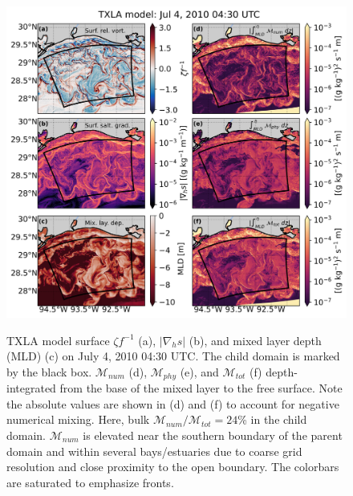 \begin{figure}
    \begin{center}
    \includegraphics[width = \linewidth]{figures/shelfstrat_2024/txla_snap_int_mld.jpg}\\
    \caption{TXLA model surface $\zeta f^{-1}$ (a), $|\nabla_h s|$ (b), and mixed layer depth (MLD) (c) on July 4, 2010 04:30 UTC. The child domain is marked by the black box. $\mathcal{M}_{num}$ (d), $\mathcal{M}_{phy}$ (e), and $\mathcal{M}_{tot}$ (f) depth-integrated from the base of the mixed layer to the free surface. Note the absolute values are shown in (d) and (f) to account for negative numerical mixing. Here, bulk $\mathcal{M}_{num}/\mathcal{M}_{tot}=24$\% in the child domain. $\mathcal{M}_{num}$ is elevated near the southern boundary of the parent domain and within several bays/estuaries due to coarse grid resolution and close proximity to the open boundary. The colorbars are saturated to emphasize fronts.} \label{fig:txla_snap}
     \end{center} 
\end{figure}

